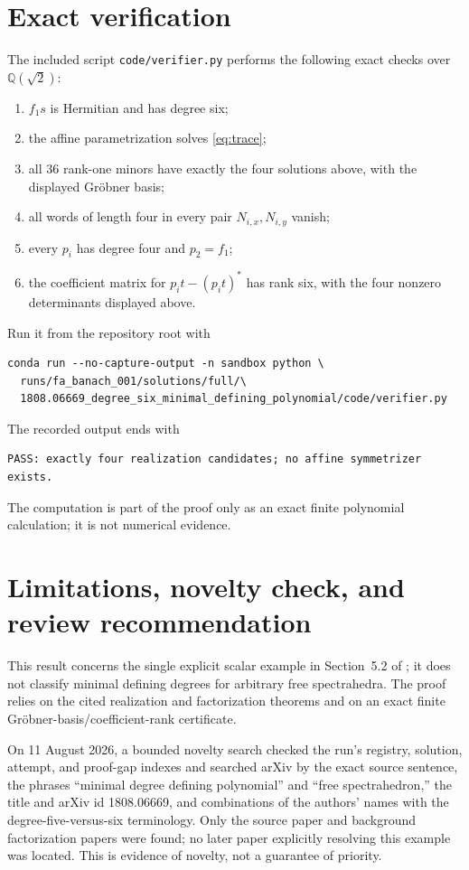 \documentclass[11pt]{article}
\begin{document}
\section{Exact verification}

The included script \texttt{code/verifier.py} performs the following exact checks over $\mathbb Q(\sqrt2)$:
\begin{enumerate}
\item $f_1s$ is Hermitian and has degree six;
\item the affine parametrization solves \eqref{eq:trace};
\item all $36$ rank-one minors have exactly the four solutions above, with the displayed Gr\"obner basis;
\item all words of length four in every pair $N_{i,x},N_{i,y}$ vanish;
\item every $p_i$ has degree four and $p_2=f_1$;
\item the coefficient matrix for $p_it-(p_it)^*$ has rank six, with the four nonzero determinants displayed above.
\end{enumerate}
Run it from the repository root with
\begin{verbatim}
conda run --no-capture-output -n sandbox python \
  runs/fa_banach_001/solutions/full/\
  1808.06669_degree_six_minimal_defining_polynomial/code/verifier.py
\end{verbatim}
The recorded output ends with
\begin{verbatim}
PASS: exactly four realization candidates; no affine symmetrizer exists.
\end{verbatim}
The computation is part of the proof only as an exact finite polynomial calculation; it is not numerical evidence.

\section{Limitations, novelty check, and review recommendation}

This result concerns the single explicit scalar example in Section~5.2 of \cite{HKMV}; it does not classify minimal defining degrees for arbitrary free spectrahedra.  The proof relies on the cited realization and factorization theorems and on an exact finite Gr\"obner-basis/coefficient-rank certificate.

On 11 August 2026, a bounded novelty search checked the run's registry, solution, attempt, and proof-gap indexes and searched arXiv by the exact source sentence, the phrases ``minimal degree defining polynomial'' and ``free spectrahedron,'' the title and arXiv id 1808.06669, and combinations of the authors' names with the degree-five-versus-six terminology.  Only the source paper and background factorization papers were found; no later paper explicitly resolving this example was located.  This is evidence of novelty, not a guarantee of priority.
\end{document}
